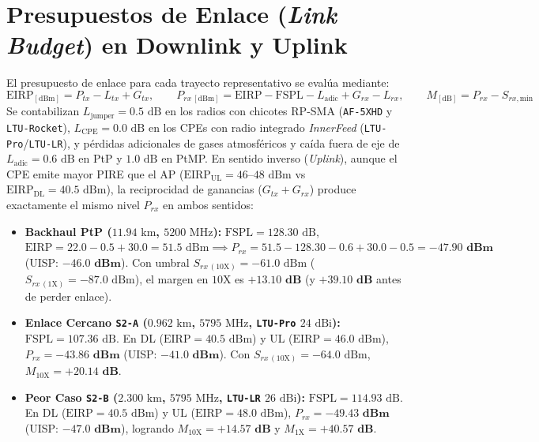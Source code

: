\documentclass[10pt,letterpaper]{article}
\begin{document}
\newpage
\section{Presupuestos de Enlace (\textit{Link Budget}) en Downlink y Uplink}

El presupuesto de enlace para cada trayecto representativo se evalúa mediante:
\begin{equation}
    \text{EIRP}_{[\text{dBm}]} = P_{tx} - L_{tx} + G_{tx}, \qquad P_{rx\,[\text{dBm}]} = \text{EIRP} - \text{FSPL} - L_{\text{adic}} + G_{rx} - L_{rx}, \qquad M_{[\text{dB}]} = P_{rx} - S_{rx,\text{min}}
\end{equation}
Se contabilizan $L_{\text{jumper}} = 0.5\text{ dB}$ en los radios con chicotes RP-SMA (\texttt{AF-5XHD} y \texttt{LTU-Rocket}), $L_{\text{CPE}} = 0.0\text{ dB}$ en los CPEs con radio integrado \textit{InnerFeed} (\texttt{LTU-Pro}/\texttt{LTU-LR}), y pérdidas adicionales de gases atmosféricos y caída fuera de eje de $L_{\text{adic}} = 0.6\text{ dB}$ en PtP y $1.0\text{ dB}$ en PtMP. En sentido inverso (\textit{Uplink}), aunque el CPE emite mayor PIRE que el AP ($\text{EIRP}_{\text{UL}} = 46\text{--}48\text{ dBm}$ vs $\text{EIRP}_{\text{DL}} = 40.5\text{ dBm}$), la reciprocidad de ganancias ($G_{tx}+G_{rx}$) produce exactamente el mismo nivel $P_{rx}$ en ambos sentidos:
\begin{itemize}
    \item \textbf{Backhaul PtP ($11.94\text{ km}$, $5200\text{ MHz}$):} $\text{FSPL} = 128.30\text{ dB}$, $\text{EIRP} = 22.0 - 0.5 + 30.0 = 51.5\text{ dBm} \implies P_{rx} = 51.5 - 128.30 - 0.6 + 30.0 - 0.5 = \mathbf{-47.90\text{ dBm}}$ (UISP: $\mathbf{-46.0\text{ dBm}}$). Con umbral $S_{rx\,(10\text{X})} = -61.0\text{ dBm}$ ($S_{rx\,(1\text{X})} = -87.0\text{ dBm}$), el margen en $10\text{X}$ es $\mathbf{+13.10\text{ dB}}$ (y $\mathbf{+39.10\text{ dB}}$ antes de perder enlace).
    \item \textbf{Enlace Cercano \texttt{S2-A} ($0.962\text{ km}$, $5795\text{ MHz}$, \texttt{LTU-Pro} $24\text{ dBi}$):} $\text{FSPL} = 107.36\text{ dB}$. En DL ($\text{EIRP}=40.5\text{ dBm}$) y UL ($\text{EIRP}=46.0\text{ dBm}$), $P_{rx} = \mathbf{-43.86\text{ dBm}}$ (UISP: $\mathbf{-41.0\text{ dBm}}$). Con $S_{rx\,(10\text{X})} = -64.0\text{ dBm}$, $M_{10\text{X}} = \mathbf{+20.14\text{ dB}}$.
    \item \textbf{Peor Caso \texttt{S2-B} ($2.300\text{ km}$, $5795\text{ MHz}$, \texttt{LTU-LR} $26\text{ dBi}$):} $\text{FSPL} = 114.93\text{ dB}$. En DL ($\text{EIRP}=40.5\text{ dBm}$) y UL ($\text{EIRP}=48.0\text{ dBm}$), $P_{rx} = \mathbf{-49.43\text{ dBm}}$ (UISP: $\mathbf{-47.0\text{ dBm}}$), logrando $M_{10\text{X}} = \mathbf{+14.57\text{ dB}}$ y $M_{1\text{X}} = \mathbf{+40.57\text{ dB}}$.
\end{itemize}
\end{document}
